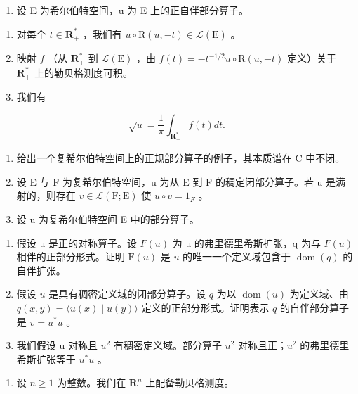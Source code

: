 \begin{enumerate}
\def\labelenumi{\arabic{enumi})}
\setcounter{enumi}{34}
\tightlist
\item
  设 E 为希尔伯特空间，u 为 E 上的正自伴部分算子。
\end{enumerate}

\begin{enumerate}
\def\labelenumi{\alph{enumi})}
\item
  对每个 \(t \in \mathbf{R}_{+}^{*}\) ，我们有 \(u \circ \mathrm{R}(u, -t) \in \mathcal{L}(\mathrm{E})\) 。
\item
  映射 \(f\) （从 \(\mathbf{R}_{+}^{*}\) 到 \(\mathcal{L}(\mathrm{E})\) ，由 \(f(t) = -t^{-1/2}u \circ \mathrm{R}(u, -t)\) 定义）关于 \(\mathbf{R}_{+}^{*}\) 上的勒贝格测度可积。
\item
  我们有
\end{enumerate}

\[
\sqrt {u} = \frac {1}{\pi} \int_ {\mathbf {R} _ {+} ^ {*}} f (t) d t.
\]

\begin{enumerate}
\def\labelenumi{\arabic{enumi})}
\setcounter{enumi}{35}
\item
  给出一个复希尔伯特空间上的正规部分算子的例子，其本质谱在 C 中不闭。
\item
  设 E 与 F 为复希尔伯特空间，u 为从 E 到 F 的稠定闭部分算子。若 u 是满射的，则存在 \(v \in \mathcal{L}(\mathrm{F}; \mathrm{E})\) 使 \(u \circ v = 1_{F}\) 。
\item
  设 u 为复希尔伯特空间 E 中的部分算子。
\end{enumerate}

\begin{enumerate}
\def\labelenumi{\alph{enumi})}
\item
  假设 u 是正的对称算子。设 \(F(u)\) 为 u 的弗里德里希斯扩张，q 为与 \(F(u)\) 相伴的正部分形式。证明 \(\mathrm{F}(u)\) 是 \(u\) 的唯一一个定义域包含于 \(\operatorname{dom}(q)\) 的自伴扩张。
\item
  假设 \(u\) 是具有稠密定义域的闭部分算子。设 \(q\) 为以 \(\operatorname{dom}(u)\) 为定义域、由 \(q(x,y) = \langle u(x) \mid u(y) \rangle\) 定义的正部分形式。证明表示 \(q\) 的自伴部分算子是 \(v = u^{*}u\) 。
\item
  我们假设 u 对称且 \(u^{2}\) 有稠密定义域。部分算子 \(u^{2}\) 对称且正；\(u^{2}\) 的弗里德里希斯扩张等于 \(u^{*}u\) 。
\end{enumerate}

\begin{enumerate}
\def\labelenumi{\arabic{enumi})}
\setcounter{enumi}{38}
\tightlist
\item
  设 \(n \geqslant 1\) 为整数。我们在 \(\mathbf{R}^n\) 上配备勒贝格测度。
\end{enumerate}


